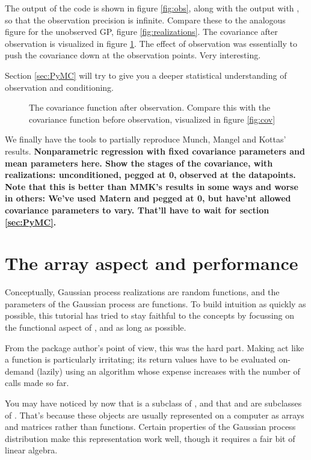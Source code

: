 \documentclass{manual}
\begin{document}
The output of the code is shown in figure \ref{fig:obs}, along with the output with , so that the observation precision is infinite. Compare these to the analogous figure for the unobserved GP, figure \ref{fig:realizations}. The covariance after observation is visualized in figure \ref{fig:obscov}. The effect of observation was essentially to push the covariance down at the observation points. Very interesting.

Section \ref{sec:PyMC} will try to give you a deeper statistical understanding of observation and conditioning. 

\begin{figure}
	\centering
	\caption{The covariance function after observation. Compare this with the covariance function before observation, visualized in figure \ref{fig:cov} }
	\label{fig:obscov}
\end{figure}

We finally have the tools to partially reproduce Munch, Mangel and Kottas' results. \textbf{Nonparametric regression with fixed covariance parameters and mean parameters here. Show the stages of the covariance, with realizations: unconditioned, pegged at 0, observed at the datapoints. Note that this is better than MMK's results in some ways and worse in others: We've used Matern and pegged at 0, but have'nt allowed covariance parameters to vary. That'll have to wait for section \ref{sec:PyMC}.}


\section{The array aspect and performance}\label{sec:array} %
Conceptually, Gaussian process realizations are random functions, and the parameters of the Gaussian process are functions. To build intuition as quickly as possible, this tutorial has tried to stay faithful to the concepts by focussing on the functional aspect of ,  and  as long as possible. 

From the package author's point of view, this was the hard part. Making  act like a function is particularly irritating; its return values have to be evaluated on-demand (lazily) using an algorithm whose expense increases with the number of calls made so far.

You may have noticed by now that  is a subclass of , and that  and  are subclasses of . That's because these objects are usually represented on a computer as arrays and matrices rather than functions. Certain properties of the Gaussian process distribution make this representation work well, though it requires a fair bit of linear algebra. 
\end{document}
